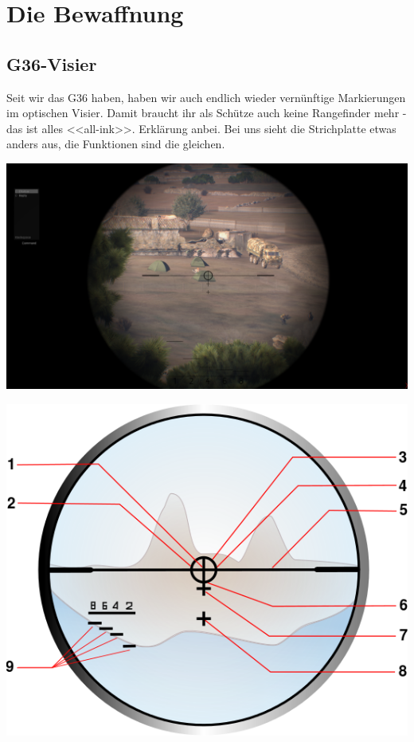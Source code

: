 \newpage
\section{Die Bewaffnung}
\subsection{G36-Visier}
	Seit wir das G36 haben, haben wir auch endlich wieder vernünftige Markierungen im optischen Visier. Damit braucht ihr als Schütze auch keine Rangefinder mehr - das ist alles <<all-ink>>. Erklärung anbei. Bei uns sieht die Strichplatte etwas anders aus, die Funktionen sind die gleichen. \\

\begin{minipage}[t]{1\textwidth}
	\includegraphics[width=\textwidth]{./Grafiken/Abschnitt/G36_teaser.png}
\end{minipage}

\begin{minipage}[t]{1\textwidth}
	\includegraphics[width=\textwidth]{./Grafiken/Abschnitt/G36_Visier.png}
\end{minipage}

